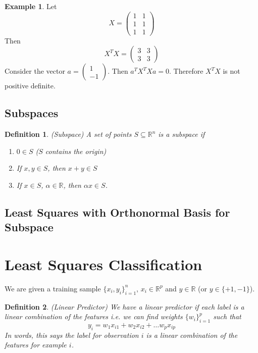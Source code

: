 \documentclass[12pt]{article}
\newtheorem{definition}{Definition}
\theoremstyle{definition}
\newtheorem{example}{Example}
\newcommand{\R}{\mathbb{R}}
\begin{document}
\begin{example}
Let
\begin{equation}
	X = 
	\begin{pmatrix}
	1 & 1 \\
	1 & 1 \\
	1 & 1
	\end{pmatrix}
\end{equation}
Then 
\begin{equation}
	X^T X = 
	\begin{pmatrix}
	3 & 3 \\
	3 & 3
	\end{pmatrix}
\end{equation}
Consider the vector $a = \begin{pmatrix} 1 \\ -1 \end{pmatrix}$. Then $a^T X^T X a = 0$. Therefore $X^T X$ is not positive definite. 
\end{example}	

\subsection{Subspaces}
\begin{definition}(Subspace)
A set of points $S \subseteq \R^n$ is a subspace if
\begin{enumerate}
	\item $0 \in S$ ($S$ contains the origin)
	\item If $x,y \in S$, then $x + y \in S$
	\item If $x \in S$, $\alpha \in \R$, then $\alpha x \in S$.
\end{enumerate}
\end{definition}

\subsection{Least Squares with Orthonormal Basis for Subspace}

\section{Least Squares Classification}
We are given a training sample $\{x_i, y_i \}_{i=1}^n$, $x_i \in \R^p$ and $y\in \R$ (or $y \in \{+1,-1\}$).

\begin{definition}(Linear Predictor)
We have a linear predictor if each label is a linear combination of the features i.e. we can find weights $\{w_i\}_{i=1}^{p}$ such that
\begin{equation}
y_i = w_1 x_{i1} + w_2 x_{i2} + \ldots w_p x_{ip}
\end{equation}
In words, this says the label for observation $i$ is a linear combination of the features for example $i$. 
\end{definition}
\end{document}
